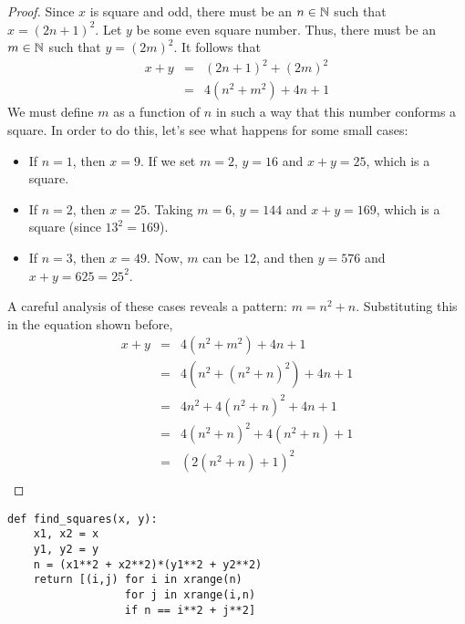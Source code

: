 \begin{proof}
Since $x$ is square and odd, there must be an $n \in \mathbb{N}$ such that
$x = (2n+1)^2$. Let $y$ be some even square number. Thus, there must be an
$m \in \mathbb{N}$ such that $y = (2m)^2$. It follows that
\begin{eqnarray*}
x+y &=& (2n+1)^2 + (2m)^2 \\
    &=& 4(n^2 + m^2) + 4n + 1 
\end{eqnarray*}
We must define $m$ as a function of $n$ in such a way that this number conforms
a square. In order to do this, let's see what happens for some small cases:
\begin{itemize}
    \item If $n = 1$, then $x = 9$. If we set $m = 2$, $y = 16$ and $x+y = 25$,
    which is a square.
    \item If $n = 2$, then $x = 25$. Taking $m = 6$, $y = 144$ and $x+y = 169$,
    which is a square (since $13^2 = 169$).
    \item If $n = 3$, then $x = 49$. Now, $m$ can be $12$, and then $y = 576$
    and $x+y = 625 = 25^2$.
\end{itemize}
A careful analysis of these cases reveals a pattern: $m = n^2 + n$. Substituting
this in the equation shown before,
\begin{eqnarray*}
x+y &=& 4(n^2 + m^2) + 4n + 1  \\
    &=& 4(n^2 + (n^2 + n)^2) + 4n + 1 \\
    &=& 4n^2 + 4(n^2 + n)^2 + 4n + 1 \\
    &=& 4(n^2 + n)^2 + 4(n^2 + n) + 1 \\
    &=& (2(n^2 + n) + 1)^2 \\
\end{eqnarray*}
\end{proof}


\newsavebox\sqpython
\begin{lrbox}{\sqpython}
    \begin{minipage}[t]{3in}
         \vspace{4px}
         \begin{verbatim}
def find_squares(x, y):
    x1, x2 = x
    y1, y2 = y
    n = (x1**2 + x2**2)*(y1**2 + y2**2)
    return [(i,j) for i in xrange(n)
                  for j in xrange(i,n)
                  if n == i**2 + j**2]
         \end{verbatim}
    \end{minipage}
\end{lrbox}

